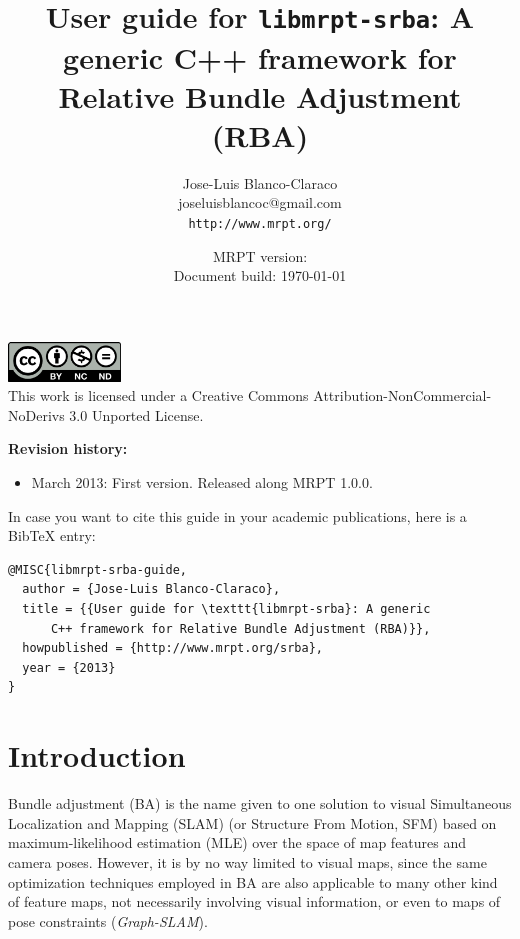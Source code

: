 \documentclass[a4paper,11pt]{article}
\title{User guide for \texttt{libmrpt-srba}: A generic C++ framework for Relative Bundle Adjustment (RBA)}
\author{Jose-Luis Blanco-Claraco \\ joseluisblancoc@gmail.com \\ \texttt{http://www.mrpt.org/} }
\date{MRPT version: \MRPTVERSION \\ Document build: \today }
\begin{document}
\maketitle


\vfill

\begin{scriptsize}
\begin{center}
\includegraphics[width=3cm]{imgs/by-nc-nd-eu.pdf}
\\
This work is licensed under a Creative Commons Attribution-NonCommercial-NoDerivs 3.0 Unported License.
\end{center}
\end{scriptsize}

\vspace{1cm}

\newpage

\textbf{Revision history:}
\begin{itemize}
 \item March 2013: First version. Released along MRPT 1.0.0.
\end{itemize}

\vfill


\begin{small}
In case you want to cite this guide in your academic publications, here is a BibTeX entry: 

\begin{verbatim}
@MISC{libmrpt-srba-guide,
  author = {Jose-Luis Blanco-Claraco},
  title = {{User guide for \texttt{libmrpt-srba}: A generic 
      C++ framework for Relative Bundle Adjustment (RBA)}},
  howpublished = {http://www.mrpt.org/srba},
  year = {2013}
} 
\end{verbatim} 

\end{small}

\vspace{1cm}

\newpage
\tableofcontents
\newpage

\section{Introduction}

Bundle adjustment (BA) is the name given to one solution to visual Simultaneous Localization and Mapping (SLAM) (or Structure From Motion, SFM) 
based on maximum-likelihood estimation (MLE) over the space of map features and camera poses. 
However, it is by no way limited to visual maps, since the same 
optimization techniques employed in BA are also applicable to many other 
kind of feature maps, not necessarily involving visual information, or even to maps of pose constraints 
(\emph{Graph-SLAM}).
\end{document}
